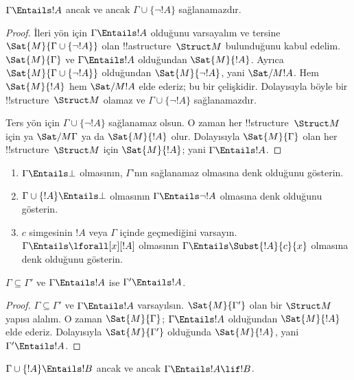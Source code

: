 \begin{prop}
$\Gamma\Entails !A$ ancak ve ancak $\Gamma\cup\{\lnot !A\}$
sağlanamazdır.
\end{prop}

\begin{proof}
İleri yön için $\Gamma\Entails !A$ olduğunu varsayalım ve tersine
$\Sat{M}{\Gamma\cup\{\lnot !A\}}$ olan !!a{structure}~$\Struct M$
bulunduğunu kabul edelim. $\Sat{M}{\Gamma}$ ve $\Gamma\Entails !A$
olduğundan $\Sat{M}{!A}$. Ayrıca
$\Sat{M}{\Gamma\cup\{\lnot !A\}}$ olduğundan $\Sat{M}{\lnot !A}$,
yani $\Sat/{M}{!A}$. Hem $\Sat{M}{!A}$ hem $\Sat/{M}{!A}$ elde
ederiz; bu bir çelişkidir. Dolayısıyla böyle bir !!{structure}~$\Struct
M$ olamaz ve $\Gamma\cup\{\lnot !A\}$ sağlanamazdır.

Ters yön için $\Gamma\cup\{\lnot !A\}$ sağlanamaz olsun. O zaman her
!!{structure}~$\Struct M$ için ya $\Sat/{M}{\Gamma}$ ya da
$\Sat{M}{!A}$ olur. Dolayısıyla $\Sat{M}{\Gamma}$ olan her
!!{structure}~$\Struct M$ için $\Sat{M}{!A}$; yani
$\Gamma\Entails !A$.
\end{proof}

\begin{prob}
\begin{enumerate}
\item $\Gamma\Entails\bot$ olmasının, $\Gamma$'nın sağlanamaz olmasına
  denk olduğunu gösterin.
\item $\Gamma\cup\{!A\}\Entails\bot$ olmasının
  $\Gamma\Entails\lnot !A$ olmasına denk olduğunu gösterin.
\item $c$ simgesinin $!A$ veya $\Gamma$ içinde geçmediğini varsayın.
  $\Gamma\Entails\lforall[x][!A]$ olmasının
  $\Gamma\Entails\Subst{!A}{c}{x}$ olmasına denk olduğunu gösterin.
\end{enumerate}
\end{prob}

\begin{prop}
$\Gamma\subseteq\Gamma'$ ve $\Gamma\Entails !A$ ise
$\Gamma'\Entails !A$.
\end{prop}

\begin{proof}
$\Gamma\subseteq\Gamma'$ ve $\Gamma\Entails !A$ varsayılsın.
$\Sat{M}{\Gamma'}$ olan bir $\Struct M$ yapısı alalım. O zaman
$\Sat{M}{\Gamma}$; $\Gamma\Entails !A$ olduğundan $\Sat{M}{!A}$ elde
ederiz. Dolayısıyla $\Sat{M}{\Gamma'}$ olduğunda $\Sat{M}{!A}$, yani
$\Gamma'\Entails !A$.
\end{proof}

\begin{thm}
$\Gamma\cup\{!A\}\Entails !B$ ancak ve ancak
$\Gamma\Entails !A\lif !B$.
\end{thm}

